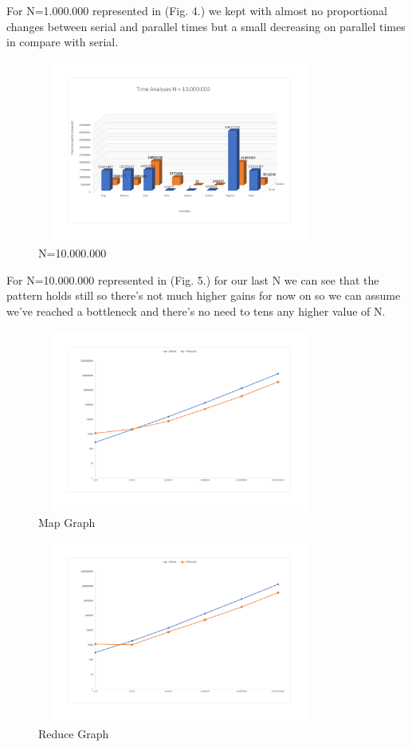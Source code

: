 \documentclass[10pt,journal,compsoc]{IEEEtran}
\begin{document}
For N=1.000.000 represented in (Fig. 4.) we kept with almost no proportional changes between serial and parallel times but a small decreasing on parallel times in compare with serial.

\begin{figure}[H]
\hspace*{-0.24in}
\includegraphics[height=6cm,width=9.44cm]{jpeg/n=10000000.pdf}
\caption{N=10.000.000}
\label{figura:10000000}
\end{figure}

For N=10.000.000 represented in (Fig. 5.) for our last N we can see that the pattern holds still so there's not much higher gains for now on so we can assume we've reached a bottleneck and there's no need to tens any higher value of N.


\begin{figure}[H]
\hspace*{-0.24in}
\includegraphics[height=6cm,width=9.44cm]{jpeg/map-graph.pdf}
\caption{Map Graph}
\label{figura:map}
\end{figure}

\begin{figure}[H]
\hspace*{-0.24in}
\includegraphics[height=6cm,width=9.44cm]{jpeg/reduce-graph.pdf}
\caption{Reduce Graph}
\label{figura:reduce}
\end{figure}
\end{document}
